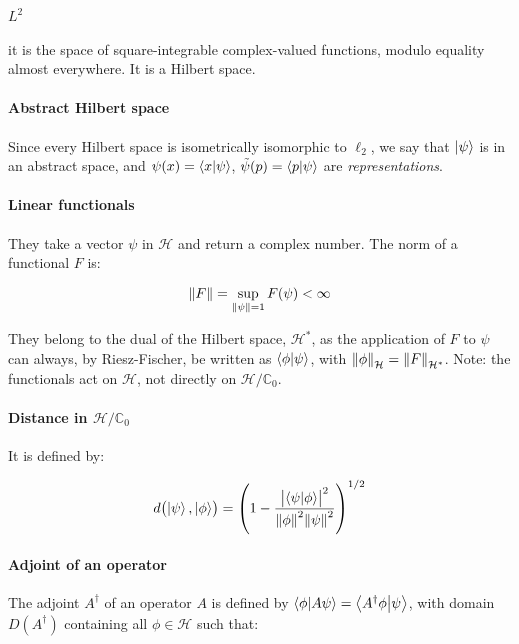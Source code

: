 \documentclass[main.tex]{subfiles}
\begin{document}
\paragraph{$L^2$} it is the space of square-integrable complex-valued functions, modulo equality almost everywhere. It is a Hilbert space.

\paragraph{Abstract Hilbert space} Since every Hilbert space is isometrically isomorphic to $\ell_2$, we say that $\ket{\psi}$ is in an abstract space, and $\psi (x) = \braket{x}{\psi}$, $\tilde{\psi} (p) = \braket{p}{\psi}$ are \emph{representations}.

\paragraph{Linear functionals} They take a vector $\psi$ in $\mathcal{H}$ and return a complex number. The norm of a functional $F$ is:

\begin{equation}
    \norm{F} = \sup _{\norm{\psi}=1} F(\psi) < \infty
\end{equation}

They belong to the dual of the Hilbert space, $\mathcal{H}^*$, as the application of $F$ to $\psi$ can always, by Riesz-Fischer, be written as $\braket{\phi}{\psi}$, with $\norm{\phi}_\mathcal{H} = \norm{F}_\mathcal{H^*}$. Note: the functionals act on $\mathcal{H}$, not directly on $\mathcal{H} / \mathbb{C}_0$.

\paragraph{Distance in $\mathcal{H} / \mathbb{C}_0$} It is defined by:

\begin{equation}
    d\qty(\ket{\psi}, \ket{\phi}) =
    \qty(
    1 - \frac{\abs{\braket{\psi}{\phi}}^2}{\norm{\phi}^2 \norm{\psi}^2}
    )^{1/2}
\end{equation}

\paragraph{Adjoint of an operator} The adjoint $A^\dag$ of an operator $A$ is defined by $\braket{\phi}{A \psi} = \braket{A^\dag \phi}{\psi}$, with domain $D(A^\dag)$ containing all $\phi \in \mathcal{H}$ such that:
\end{document}
